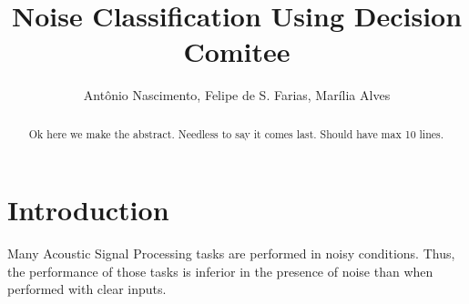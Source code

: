 \documentclass[12pt]{article}
\title{Noise Classification Using Decision Comitee}
\author{Antônio Nascimento\inst{1}, Felipe de S. Farias\inst{1}, Marília Alves \inst{2}}
\begin{document}
 

\maketitle

\begin{abstract}


Ok here we make the abstract. Needless to say it comes last. Should have max 10 lines.

\end{abstract}
     


\section{Introduction} \label{sec:intro}



Many Acoustic Signal Processing tasks are performed in noisy conditions. Thus, the performance of those tasks is inferior in the presence of noise than when performed with clear inputs.
\end{document}
